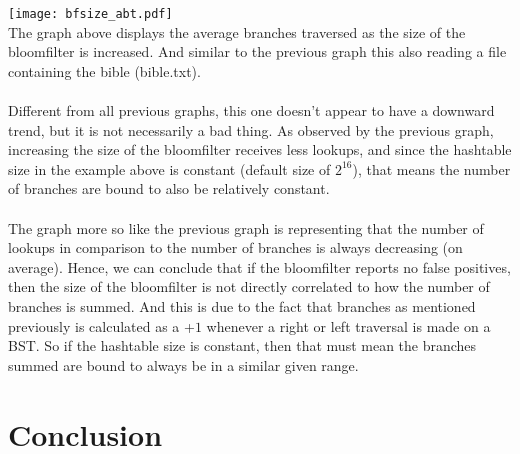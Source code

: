\documentclass[
	12pt, %
]{fphw}
\begin{document}
\texttt{[image: bfsize\_abt.pdf]}
\\
The graph above displays the average branches traversed as the size of the bloomfilter is increased. And similar to the previous graph this also reading a file containing the bible (bible.txt). \\
\\
Different from all previous graphs, this one doesn't appear to have a downward trend, but it is not necessarily a bad thing. As observed by the previous graph, increasing the size of the bloomfilter receives less lookups, and since the hashtable size in the example above is constant (default size of $2^{16}$), that means the number of branches are bound to also be relatively constant. \\
\\
The graph more so like the previous graph is representing that the number of lookups in comparison to the number of branches is always decreasing (on average). Hence, we can conclude that if the bloomfilter reports no false positives, then the size of the bloomfilter is not directly correlated to how the number of branches is summed. And this is due to the fact that branches as mentioned previously is calculated as a +$1$ whenever a right or left traversal is made on a BST. So if the hashtable size is constant, then that must mean the branches summed are bound to always be in a similar given range.

\section{Conclusion}
\end{document}
